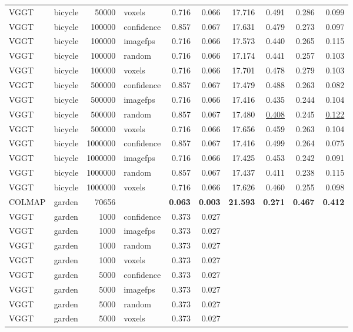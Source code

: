\begin{table}[H]
\begin{tabular}{llrlrrrrrr}
VGGT & bicycle & 50000 & voxels & 0.716 & 0.066 & 17.716 & 0.491 & 0.286 & 0.099 \\
VGGT & bicycle & 100000 & confidence & 0.857 & 0.067 & 17.631 & 0.479 & 0.273 & 0.097 \\
VGGT & bicycle & 100000 & imagefps & 0.716 & 0.066 & 17.573 & 0.440 & 0.265 & 0.115 \\
VGGT & bicycle & 100000 & random & 0.716 & 0.066 & 17.174 & 0.441 & 0.257 & 0.103 \\
VGGT & bicycle & 100000 & voxels & 0.716 & 0.066 & 17.701 & 0.478 & 0.279 & 0.103 \\
VGGT & bicycle & 500000 & confidence & 0.857 & 0.067 & 17.479 & 0.488 & 0.263 & 0.082 \\
VGGT & bicycle & 500000 & imagefps & 0.716 & 0.066 & 17.416 & 0.435 & 0.244 & 0.104 \\
VGGT & bicycle & 500000 & random & 0.857 & 0.067 & 17.480 & \underline{0.408} & 0.245 & \underline{0.122} \\
VGGT & bicycle & 500000 & voxels & 0.716 & 0.066 & 17.656 & 0.459 & 0.263 & 0.104 \\
VGGT & bicycle & 1000000 & confidence & 0.857 & 0.067 & 17.416 & 0.499 & 0.264 & 0.075 \\
VGGT & bicycle & 1000000 & imagefps & 0.716 & 0.066 & 17.425 & 0.453 & 0.242 & 0.091 \\
VGGT & bicycle & 1000000 & random & 0.857 & 0.067 & 17.437 & 0.411 & 0.238 & 0.115 \\
VGGT & bicycle & 1000000 & voxels & 0.716 & 0.066 & 17.626 & 0.460 & 0.255 & 0.098 \\
\midrule
COLMAP & garden & 70656 &  & \textbf{0.063} & \textbf{0.003} & \textbf{21.593} & \textbf{0.271} & \textbf{0.467} & \textbf{0.412} \\
VGGT & garden & 1000 & confidence & 0.373 & 0.027 &  &  &  &  \\
VGGT & garden & 1000 & imagefps & 0.373 & 0.027 &  &  &  &  \\
VGGT & garden & 1000 & random & 0.373 & 0.027 &  &  &  &  \\
VGGT & garden & 1000 & voxels & 0.373 & 0.027 &  &  &  &  \\
VGGT & garden & 5000 & confidence & 0.373 & 0.027 &  &  &  &  \\
VGGT & garden & 5000 & imagefps & 0.373 & 0.027 &  &  &  &  \\
VGGT & garden & 5000 & random & 0.373 & 0.027 &  &  &  &  \\
VGGT & garden & 5000 & voxels & 0.373 & 0.027 &  &  &  &  \\

\end{tabular}
\end{table}
